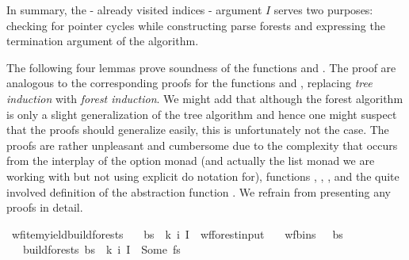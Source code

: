 \begin{isabellebody}
\begin{isamarkuptext}
In summary, the - already visited indices - argument $I$ serves two purposes: checking for pointer cycles while
constructing parse forests and expressing the termination argument of the algorithm.%
\end{isamarkuptext}\isamarkuptrue%
%
\isadelimdocument
%
\endisadelimdocument
%
\isatagdocument
%
\isamarkuptrue%
%
\endisatagdocument
{\isafolddocument}%
%
\isadelimdocument
%
\endisadelimdocument
%
\begin{isamarkuptext}%
The following four lemmas prove soundness of the functions  and .
The proof are analogous to the corresponding proofs for the functions  and ,
replacing \textit{tree induction} with \textit{forest induction}. We might add that although the forest algorithm
is only a slight generalization of the tree algorithm and hence one might suspect that the proofs should generalize
easily, this is unfortunately not the case. The proofs are rather unpleasant and cumbersome due to the complexity
that occurs from the interplay of the option monad (and actually the list monad we are working with but not using explicit do notation for), functions , ,
, and the quite involved definition of the abstraction function . We refrain from
presenting any proofs in detail.%
\end{isamarkuptext}\isamarkuptrue%
\isamarkupfalse%
\ wf{\isacharunderscore}{\kern0pt}item{\isacharunderscore}{\kern0pt}yield{\isacharunderscore}{\kern0pt}build{\isacharunderscore}{\kern0pt}forests{\isacharprime}{\kern0pt}{\isacharcolon}{\kern0pt}\isanewline
\ \ \ {\isachardoublequoteopen}{\isacharparenleft}{\kern0pt}bs{\isacharcomma}{\kern0pt}\ {\isasymomega}{\isacharcomma}{\kern0pt}\ k{\isacharcomma}{\kern0pt}\ i{\isacharcomma}{\kern0pt}\ I{\isacharparenright}{\kern0pt}\ {\isasymin}\ wf{\isacharunderscore}{\kern0pt}forest{\isacharunderscore}{\kern0pt}input{\isachardoublequoteclose}\isanewline
\ \ \ {\isachardoublequoteopen}wf{\isacharunderscore}{\kern0pt}bins\ {\isasymG}\ {\isasymomega}\ bs{\isachardoublequoteclose}\isanewline
\ \ \ {\isachardoublequoteopen}build{\isacharunderscore}{\kern0pt}forests{\isacharprime}{\kern0pt}\ bs\ {\isasymomega}\ k\ i\ I\ {\isacharequal}{\kern0pt}\ Some\ fs{\isachardoublequoteclose}\isanewline

\end{isabellebody}
